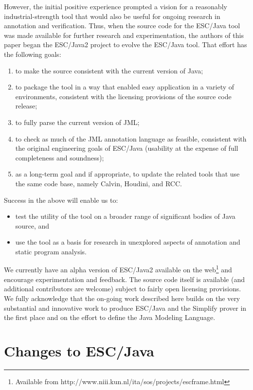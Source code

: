 \documentclass{acm_proc_article-sp}
\begin{document}
However, the initial positive experience prompted a vision for a
reasonably industrial-strength tool that would also be useful for
ongoing research in annotation and verification.  Thus, when the
source code for the ESC/Java tool was made available for further
research and experimentation, the authors of this paper began the
ESC/Java2 project to evolve the ESC/Java tool.  That effort has the
following goals:
\begin{enumerate}
\item to make the source consistent with the current version of Java;
\item to package the tool in a way that enabled easy application in a
  variety of environments, consistent with the licensing provisions of
  the source code release;
\item to fully parse the current version of JML;
\item to check as much of the JML annotation language as feasible,
  consistent with the original engineering goals of ESC/Java
  (usability at the expense of full completeness and soundness);
\item as a long-term goal and if appropriate, to update the related
  tools that use the same code base, namely Calvin, Houdini, and RCC.
\end{enumerate}
Success in the above will enable us to:
\begin{itemize}
\item test the utility of the tool on a broader range of significant
  bodies of Java source, and
\item use the tool as a basis for research in unexplored aspects of
  annotation and static program analysis.
\end{itemize}

We currently have an alpha version of ESC/Java2 available on the
web\footnote{Available from 
{http://www.niii.kun.nl/ita/sos/projects/escframe.html}}
and encourage experimentation and feedback.  The source code itself is
available (and additional contributors are welcome) subject to fairly
open licensing provisions.  We fully acknowledge that the on-going
work described here builds on the very substantial and innovative work
to produce ESC/Java and the Simplify prover in the first place and on
the effort to define the Java Modeling Language.

\section{Changes to ESC/Java}
\end{document}
